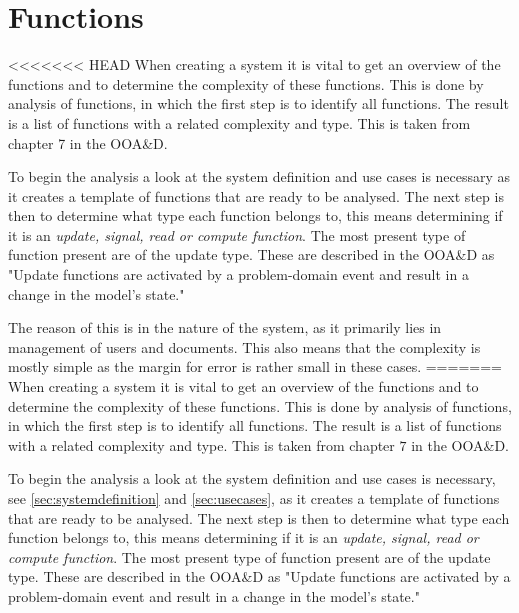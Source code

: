 \section{Functions}
<<<<<<< HEAD
When creating a system it is vital to get an overview of the functions and to determine the complexity of these functions. This is done by analysis of functions, in which the first step is to identify all functions. The result is a list of functions with a related complexity and type. This is taken from chapter 7 in the OOA\&D.\citep[ch.~7]{Rod-Aalborg}

To begin the analysis a look at the system definition and use cases is necessary as it creates a template of functions that are ready to be analysed. The next step is then to determine what type each function belongs to, this means determining if it is an \textit{update, signal, read or compute function}. The most present type of function present are of the update type. These are described in the OOA\&D as "Update functions are activated by a problem-domain event and result in a change in the model's state."\citep[p.~140]{Rod-Aalborg}


The reason of this is in the nature of the system, as it primarily lies in management of users and documents. This also means that the complexity is mostly simple as the margin for error is rather small in these cases. 
=======
When creating a system it is vital to get an overview of the functions and to determine the complexity of these functions.
This is done by analysis of functions, in which the first step is to identify all functions.
The result is a list of functions with a related complexity and type.
This is taken from chapter $7$ in the OOA\&D.\citep[ch.~7]{Rod-Aalborg}

To begin the analysis a look at the system definition and use cases is necessary, see \cref{sec:systemdefinition} and \cref{sec:usecases}, as it creates a template of functions that are ready to be analysed.
The next step is then to determine what type each function belongs to, this means determining if it is an \textit{update, signal, read or compute function}.
The most present type of function present are of the update type.
These are described in the OOA\&D as "Update functions are activated by a problem-domain event and result in a change in the model's state."\citep[p.~140]{Rod-Aalborg}

